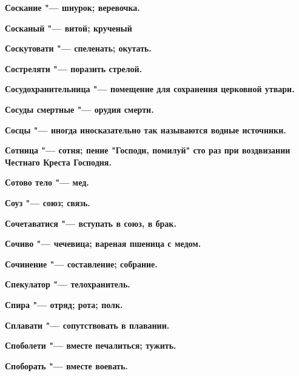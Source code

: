 \bfseries Соскание \normalfont{} "--- шнурок; веревочка. 




\bfseries Сосканый \normalfont{} "--- витой; крученый 




\bfseries Соскутовати \normalfont{} "--- спеленать; окутать. 




\bfseries Состреляти \normalfont{} "--- поразить стрелой. 




\bfseries Сосудохранительница \normalfont{} "--- помещение для сохранения церковной утвари. 




\bfseries Сосуды смертные \normalfont{} "--- орудия смерти. 




\bfseries Сосцы \normalfont{} "--- иногда иносказательно так называются водные источники. 




\bfseries Сотница \normalfont{} "--- сотня; пение "Господи, помилуй" сто раз при воздвизании Честнаго Креста Господня. 




\bfseries Сотово тело \normalfont{} "--- мед. 




\bfseries Соуз \normalfont{} "--- союз; связь. 




\bfseries Сочетаватися \normalfont{} "--- вступать в союз, в брак. 




\bfseries Сочиво \normalfont{} "--- чечевица; вареная пшеница с медом. 




\bfseries Сочинение \normalfont{} "--- составление; собрание. 




\bfseries Спекулатор \normalfont{} "--- телохранитель. 




\bfseries Спира \normalfont{} "--- отряд; рота; полк. 




\bfseries Сплавати \normalfont{} "--- сопутствовать в плавании. 




\bfseries Споболети \normalfont{} "--- вместе печалиться; тужить. 




\bfseries Споборать \normalfont{} "--- вместе воевать. 




